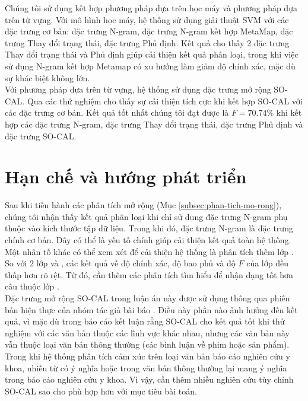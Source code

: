Chúng tôi sử dụng kết hợp phương pháp dựa trên học máy và phương pháp dựa trên từ vựng. Với mô hình học máy, hệ thống sử dụng giải thuật SVM với các đặc trưng cơ bản: đặc trưng N-gram, đặc trưng N-gram kết hợp MetaMap, đặc trưng Thay đổi trạng thái, đặc trưng Phủ định. Kết quả cho thấy 2 đặc trưng Thay đổi trạng thái và Phủ định giúp cải thiện kết quả phân loại, trong khi việc sử dụng N-gram kết hợp Metamap có xu hướng làm giảm độ chính xác, mặc dù sự khác biệt không lớn.\\

Với phương pháp dựa trên từ vựng, hệ thống sử dụng đặc trưng mở rộng SO-CAL. Qua các thử nghiệm cho thấy sự cải thiện tích cực khi kết hợp SO-CAL với các đặc trưng cơ bản. Kết quả tốt nhất chúng tôi đạt được là $F=70.74\%$ khi kết hợp các đặc trưng N-gram, đặc trưng Thay đổi trạng thái, đặc trưng Phủ định và đặc trưng SO-CAL.
\section{Hạn chế và hướng phát triển}
Sau khi tiến hành các phân tích mở rộng (Mục \ref{subsec:phan-tich-mo-rong}), chúng tôi nhận thấy kết quả phân loại khi chỉ sử dụng đặc trưng N-gram phụ thuộc vào kích thước tập dữ liệu. Trong khi đó, đặc trưng N-gram là đặc trưng chính cơ bản. Đây có thể là yếu tố chính giúp cải thiện kết quả toàn hệ thống. \\

Một nhân tố khác có thể xem xét để cải thiện hệ thống là phân tích thêm lớp \tieucuc. So với 2 lớp \tichcuc và \trungtinh, các kết quả về độ chính xác, độ bao phủ và độ $F$ của lớp \tieucuc đều thấp hơn rõ rệt. Từ đó, cần thêm các phân tích tìm hiểu để nhận dạng tốt hơn câu thuộc lớp \tieucuc.\\

Đặc trưng mở rộng SO-CAL trong luận án này được sử dụng thông qua phiên bản hiện thực của nhóm tác giả bài báo \cite{taboada2011lexicon}. Điều này phần nào ảnh hưởng đến kết quả, vì mặc dù trong báo cáo \cite{taboada2011lexicon} kết luận rằng SO-CAL cho kết quả tốt khi thử nghiệm với các văn bản thuộc các lĩnh vực khác nhau, nhưng các văn bản này vẫn thuộc loại văn bản thông thường (các bình luận về phim hoặc sản phẩm). Trong khi hệ thống phân tích cảm xúc trên loại văn bản báo cáo nghiên cứu y khoa, nhiều từ có ý nghĩa \tieucuc hoặc \trungtinh trong văn bản thông thường lại mang ý nghĩa \tichcuc trong báo cáo nghiên cứu y khoa. Vì vậy, cần thêm nhiều nghiên cứu tùy chỉnh SO-CAL sao cho phù hợp hơn với mục tiêu bài toán.